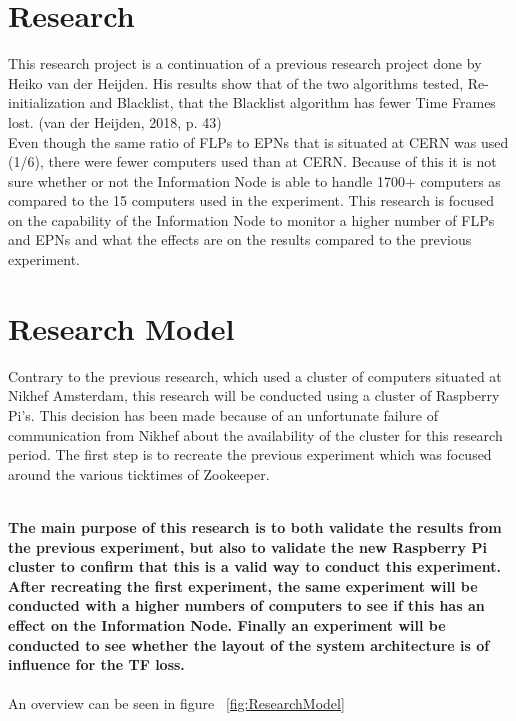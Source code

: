 

\section{Research}
This research project is a continuation of a previous research project done by Heiko van der Heijden. His results show that of the two algorithms tested, Re-initialization and Blacklist, that the Blacklist algorithm has fewer Time Frames lost. (van der Heijden, 2018, p. 43)\\
Even though the same ratio of FLPs to EPNs that is situated at CERN was used (1/6), there were fewer computers used than at CERN. Because of this it is not sure whether or not the Information Node is able to handle 1700+ computers as compared to the 15 computers used in the experiment. This research is focused on the capability of the Information Node to monitor a higher number of FLPs and EPNs and what the effects are on the results compared to the previous experiment.\\

\section{Research Model}
Contrary to the previous research, which used a cluster of computers situated at Nikhef Amsterdam, this research will be conducted using a cluster of Raspberry Pi's. This decision has been made because of an unfortunate failure of communication from Nikhef about the availability of the cluster for this research period. The first step is to recreate the previous experiment which was focused around the various ticktimes of Zookeeper.
\newpage

~\\\textbf{The main purpose of this research is to both validate the results from the previous experiment, but also to validate the new Raspberry Pi cluster to confirm that this is a valid way to conduct this experiment. After recreating the first experiment, the same experiment will be conducted with a higher numbers of computers to see if this has an effect on the Information Node. Finally an experiment will be conducted to see whether the layout of the system architecture is of influence for the TF loss.} \\~\\
An overview can be seen in figure ~\ref{fig:ResearchModel}

